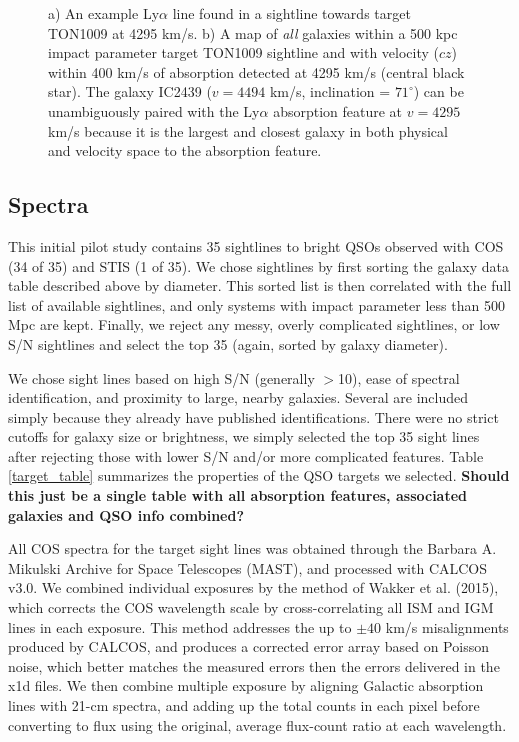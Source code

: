 \documentclass[iop]{emulateapj-rtx4}
\begin{document}
\begin{figure}[h!]
  \caption{\small{a) An example Ly$\alpha$ line found in a sightline towards target TON1009 at 4295 km/s. b) A map of \textit{all} galaxies within a 500 kpc impact parameter target TON1009 sightline and with velocity ($cz$) within 400 km/s of absorption detected at 4295 km/s (central black star). The galaxy IC2439 ($v=4494$ km/s, inclination = $71^{\circ}$) can be unambiguously paired with the Ly$\alpha$ absorption feature at $v=4295$ km/s because it is the largest and closest galaxy in both physical and velocity space to the absorption feature.}}
\vspace{5pt}
\end{figure}



\subsection{Spectra}

This initial pilot study contains 35 sightlines to bright QSOs observed with COS (34 of 35) and STIS (1 of 35). We chose sightlines by first sorting the galaxy data table described above by diameter. This sorted list is then correlated with the full list of available sightlines, and only systems with impact parameter less than 500 Mpc are kept. Finally, we reject any messy, overly complicated sightlines, or low S/N sightlines and select the top 35 (again, sorted by galaxy diameter). 

We chose sight lines based on high S/N (generally $>$10), ease of spectral identification, and proximity to large, nearby galaxies. Several are included simply because they already have published identifications. There were no strict cutoffs for galaxy size or brightness, we simply selected the top 35 sight lines after rejecting those with lower S/N and/or more complicated features. Table \ref{target_table} summarizes the properties of the QSO targets we selected. \textbf{Should this just be a single table with all absorption features, associated galaxies and QSO info combined?}

All COS spectra for the target sight lines was obtained through the Barbara A. Mikulski Archive for Space Telescopes (MAST), and processed with CALCOS v3.0. We combined individual exposures by the method of Wakker et al. (2015), which corrects the COS wavelength scale by cross-correlating all ISM and IGM lines in each exposure. This method addresses the up to $\pm40$ km/s misalignments produced by CALCOS, and produces a corrected error array based on Poisson noise, which better matches the measured errors then the errors delivered in the x1d files. We then combine multiple exposure by aligning Galactic absorption lines with 21-cm spectra, and adding up the total counts in each pixel before converting to flux using the original, average flux-count ratio at each wavelength.
\end{document}
